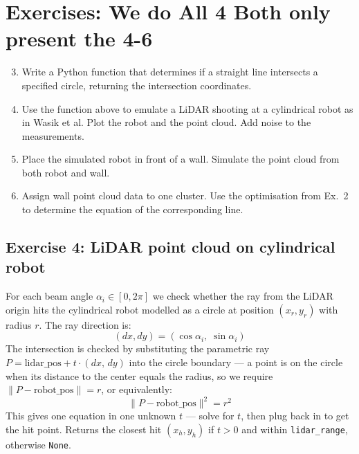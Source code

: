 \documentclass[12pt, a4paper]{article}
\begin{document}
\section*{Exercises: We do All 4 Both only present the 4-6}
\vspace{-0.5cm}
\begin{enumerate}
  \setcounter{enumi}{2}
  \item Write a Python function that determines if a straight line intersects
        a specified circle, returning the intersection coordinates.
  \item Use the function above to emulate a LiDAR shooting at a cylindrical
        robot as in Wasik et al. Plot the robot and the point cloud.
        Add noise to the measurements.
  \item Place the simulated robot in front of a wall.
        Simulate the point cloud from both robot and wall.
  \item Assign wall point cloud data to one cluster. Use the optimisation
        from Ex.\ 2 to determine the equation of the corresponding line.
\end{enumerate}
\vspace{-0.2cm}
\subsection*{Exercise 4: LiDAR point cloud on cylindrical robot}
\vspace{-0.2cm}
For each beam angle $\alpha_i \in [0, 2\pi]$ we check whether the ray from the
LiDAR origin hits the cylindrical robot modelled as a circle at position
$(x_r, y_r)$ with radius $r$. The ray direction is:
\[
  (dx, dy) = (\cos\alpha_i,\; \sin\alpha_i)
\]
The intersection is checked by substituting the parametric ray
$P = \text{lidar\_pos} + t\cdot(dx,\,dy)$ into the circle boundary ---
a point is on the circle when its distance to the center equals the radius,
so we require $\|P - \text{robot\_pos}\| = r$, or equivalently:
\[
  \|P - \text{robot\_pos}\|^2 = r^2
\]
This gives one equation in one unknown $t$ --- solve for $t$, then plug back
in to get the hit point. Returns the closest hit $(x_h, y_h)$
if $t > 0$ and within \texttt{lidar\_range}, otherwise \texttt{None}.
\end{document}
